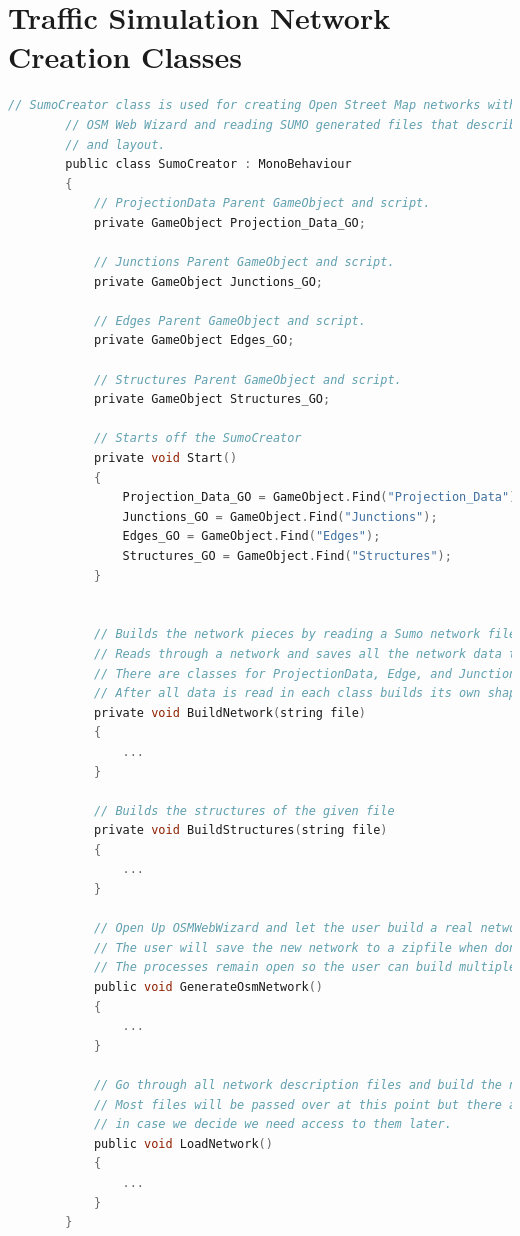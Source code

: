 \documentclass[letterpaper, 10pt, onecolumn, draftclsnofoot]{IEEEtran}
\begin{document}
\newpage
\section{Traffic Simulation Network Creation Classes}
    \begin{lstlisting}[language=c, style=mystyle, caption=SumoCreator.cs]
        // SumoCreator class is used for creating Open Street Map networks with SUMO's
        // OSM Web Wizard and reading SUMO generated files that describe a networks logic 
        // and layout. 
        public class SumoCreator : MonoBehaviour
        {
            // ProjectionData Parent GameObject and script.
            private GameObject Projection_Data_GO;
            
            // Junctions Parent GameObject and script.
            private GameObject Junctions_GO;
            
            // Edges Parent GameObject and script.
            private GameObject Edges_GO;
            
            // Structures Parent GameObject and script. 
            private GameObject Structures_GO;
            
            // Starts off the SumoCreator
            private void Start()
            {
                Projection_Data_GO = GameObject.Find("Projection_Data");
                Junctions_GO = GameObject.Find("Junctions");
                Edges_GO = GameObject.Find("Edges");
                Structures_GO = GameObject.Find("Structures");
            }
        
            
            // Builds the network pieces by reading a Sumo network file.
            // Reads through a network and saves all the network data to the handling class.
            // There are classes for ProjectionData, Edge, and Junction.
            // After all data is read in each class builds its own shapes. 
            private void BuildNetwork(string file)
            {
                ...
            }
            
            // Builds the structures of the given file
            private void BuildStructures(string file)
            {
                ...
            }
        
            // Open Up OSMWebWizard and let the user build a real network.
            // The user will save the new network to a zipfile when done.
            // The processes remain open so the user can build multiple network at once.
            public void GenerateOsmNetwork()
            {
                ...
            }
        
            // Go through all network description files and build the network into Unity.
            // Most files will be passed over at this point but there are some handles left 
            // in case we decide we need access to them later.
            public void LoadNetwork()
            {
                ...
            }
        }
    \end{lstlisting}

\newpage
\appendices

\newpage


        
\end{document}
